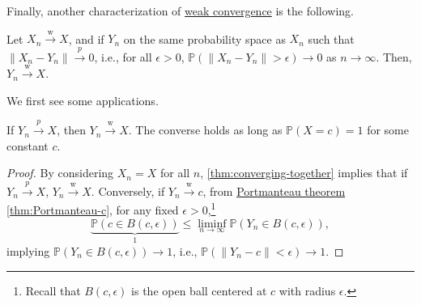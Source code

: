 Finally, another characterization of \hyperref[def:weak-convergence]{weak convergence} is the following.

\begin{theorem}\label{thm:converging-together}
	Let \(X_n \overset{\text{w} }{\to } X\), and if \(Y_n\) on the same probability space as \(X_n\) such that \(\lVert X_n - Y_n \rVert \overset{p}{\to } 0\), i.e., for all \(\epsilon > 0\), \(\mathbb{P} (\lVert X_n - Y_n \rVert > \epsilon ) \to 0\) as \(n \to \infty\). Then, \(Y_n \overset{\text{w} }{\to } X\).
\end{theorem}

We first see some applications.

\begin{corollary}
	If \(Y_n \overset{p}{\to } X\), then \(Y_n \overset{\text{w} }{\to } X\). The converse holds as long as \(\mathbb{P} (X = c) = 1\) for some constant \(c\).
\end{corollary}
\begin{proof}
	By considering \(X_n = X\) for all \(n\), \autoref{thm:converging-together} implies that if \(Y_n \overset{p}{\to } X\), \(Y_n \overset{\text{w} }{\to } X\). Conversely, if \(Y_n \overset{\text{w} }{\to } c\), from \hyperref[thm:Portmanteau]{Portmanteau theorem} \autoref{thm:Portmanteau-c}, for any fixed \(\epsilon > 0\),\footnote{Recall that \(B(c, \epsilon )\) is the open ball centered at \(c\) with radius \(\epsilon \).}
	\[
		\underbrace{\mathbb{P} (c \in B(c, \epsilon ))}_{1}
		\leq \liminf_{n \to \infty} \mathbb{P} (Y_n \in B(c, \epsilon )),
	\]
	implying \(\mathbb{P} (Y_n \in B(c, \epsilon )) \to 1\), i.e., \(\mathbb{P} (\lVert Y_n - c \rVert < \epsilon ) \to 1\).
\end{proof}